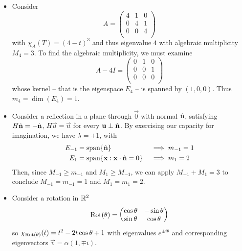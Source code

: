 \documentclass{../template/note}
\begin{document}
    \begin{example}
        \begin{itemize}
            \item Consider
            \[
                A = \begin{pmatrix}
                 4 & 1 & 0 \\
                 0 & 4 & 1 \\
                 0 & 0 & 4 \\
                \end{pmatrix}
            \]
            with \(\chi_A(T) = (4-t)^3\) and thus eigenvalue \(4\) with algebraic multiplicity \(M_4 = 3\). To find the algebraic multiplicity, we must examine
            \[
                A - 4I = \begin{pmatrix}
                 0 & 1 & 0 \\
                 0 & 0 & 1 \\
                 0 & 0 & 0 \\
                \end{pmatrix}
            \]
            whose kernel -- that is the eigenspace \(E_4\) -- is spanned by \((1, 0, 0)\). Thus \(m_4 = \dim(E_4) = 1\).
            \item Consider a reflection in a plane through \(\vec 0\) with normal \(\hvec n\), satisfying \(H \hvec n = -\hvec n\), \(H \vec u = \vec u\) for every \(\vec u \perp \hvec n\). By exercising our capacity for imagination, we have \(\lambda = \pm 1\), with
            \begin{align*}
                E_{-1} &= \Span \{\hvec n\} &&\implies m_{-1} = 1\\
                E_1 &= \Span \{\vec x : \vec x \cdot \hvec n = 0\} &&\implies m_1 = 2
            \end{align*}
            Then, since \(M_{-1} \geq m_{-1}\) and \(M_1 \geq M_{-1}\), we can apply \(M_{-1} + M_1 = 3\) to conclude \(M_{-1} = m_{-1} = 1\) and \(M_1 = m_1 = 2\).
            \item Consider a rotation in \(\mathbb R^2\)
            \[
                \operatorname{Rot}(\theta) = \begin{pmatrix}
                 \cos \theta & -\sin \theta \\
                 \sin \theta & \cos \theta \\
                \end{pmatrix}
            \]
            so \(\chi_{\operatorname{Rot}(\theta)}(t) = t^2 - 2t \cos \theta + 1\) with eigenvalues \(e^{\pm i \theta}\) and corresponding eigenvectors \(\vec v = \alpha (1, \mp i)\).

\end{itemize}
\end{example}
\end{document}
